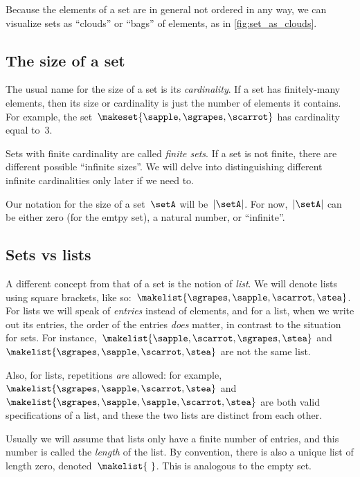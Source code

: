 Because the elements of a set are in general not ordered in any way, we can visualize sets as ``clouds'' or ``bags'' of elements, as in \cref{fig:set_as_clouds}.





\subsection{The size of a set}

The usual name for the size of a set is its \emph{cardinality}.
If a set has finitely-many elements, then its size or cardinality is just the number of elements it contains.
For example, the  set~$\makeset{ \sapple, \sgrapes, \scarrot }$ has cardinality equal to~$3$.

Sets with finite cardinality are called \emph{finite sets}.
If a set is not finite, there are different possible ``infinite sizes''.
We will delve into distinguishing different infinite cardinalities only later if we need to.

Our notation for the size of a set~$\setA$ will be~$\vert \setA \vert$.
For now,~$\vert \setA \vert$ can be either zero (for the emtpy set), a natural number, or ``infinite''.

\subsection{Sets vs lists}

A different concept from that of a set is the notion of \emph{list}.
We will denote lists using square brackets, like so:~$\makelist{\sgrapes, \sapple, \scarrot, \stea}$.
For lists we will speak of \emph{entries} instead of elements, and for a list, when we write out its entries, the order of the entries \emph{does} matter, in contrast to the situation for sets.
For instance,~$\makelist{\sapple, \scarrot, \sgrapes, \stea}$ and~$\makelist{\sgrapes, \sapple, \scarrot, \stea}$ are not the same list.

Also, for lists, repetitions \emph{are} allowed: for example,~$\makelist{\sgrapes, \sapple, \scarrot, \stea}$ and~$\makelist{\sgrapes, \sapple, \sapple, \scarrot, \stea}$ are both valid specifications of a list, and these the two lists are distinct from each other.

Usually we will assume that lists only have a finite number of entries, and this number is called the \emph{length} of the list.
By convention, there is also a unique list of length zero, denoted~$\makelist{\ }$.
This is analogous to the empty set.

